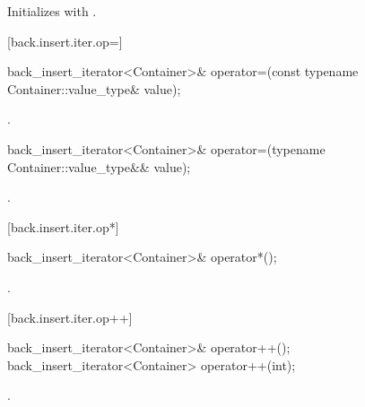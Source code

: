 \begin{itemdescr}
\pnum
\effects
Initializes
with .
\end{itemdescr}

[back.insert.iter.op=]{}

%
\begin{itemdecl}
back_insert_iterator<Container>&
  operator=(const typename Container::value_type& value);
\end{itemdecl}

\begin{itemdescr}
\pnum
\effects
{}

\pnum
\returns
{}.
\end{itemdescr}

%
\begin{itemdecl}
back_insert_iterator<Container>&
  operator=(typename Container::value_type&& value);
\end{itemdecl}

\begin{itemdescr}
\pnum
\effects
{}

\pnum
\returns
{}.
\end{itemdescr}

[back.insert.iter.op*]{}

%
\begin{itemdecl}
back_insert_iterator<Container>& operator*();
\end{itemdecl}

\begin{itemdescr}
\pnum
\returns
{}.
\end{itemdescr}

[back.insert.iter.op++]{}

%
\begin{itemdecl}
back_insert_iterator<Container>& operator++();
back_insert_iterator<Container>  operator++(int);
\end{itemdecl}

\begin{itemdescr}
\pnum
\returns
{}.
\end{itemdescr}

